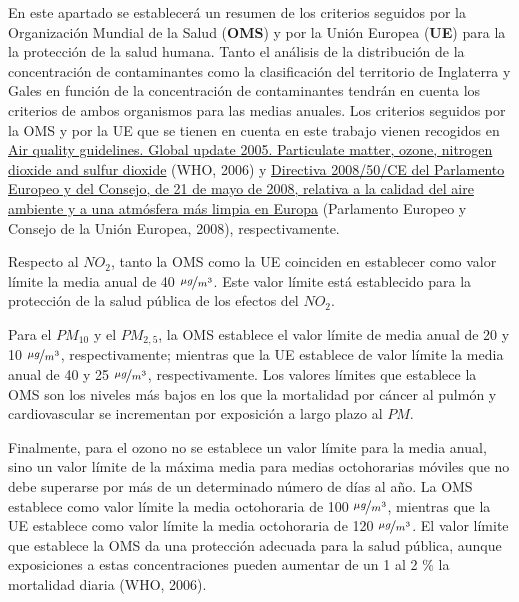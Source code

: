 \documentclass[12pt]{article}
\begin{document}
En este apartado se establecerá un resumen de los criterios seguidos por la Organización Mundial de la Salud (\textbf{OMS}) y por la Unión Europea (\textbf{UE}) para la la protección de la salud humana. Tanto el análisis de la distribución de la concentración de contaminantes como la clasificación del territorio de Inglaterra y Gales en función de la concentración de contaminantes tendrán en cuenta los criterios de ambos organismos para las medias anuales. Los criterios seguidos por la OMS y por la UE que se tienen en cuenta en este trabajo vienen recogidos en \href{http://www.euro.who.int/en/health-topics/environment-and-health/Housing-and-health/publications/pre-2009/air-quality-guidelines.-global-update-2005.-particulate-matter,-ozone,-nitrogen-dioxide-and-sulfur-dioxide}{Air quality guidelines. Global update 2005. Particulate matter, ozone, nitrogen dioxide and sulfur dioxide} (WHO, 2006) y \href{https://www.boe.es/buscar/doc.php?id=DOUE-L-2008-81053}{Directiva 2008/50/CE del Parlamento Europeo y del Consejo, de 21 de mayo de 2008, relativa a la calidad del aire ambiente y a una atmósfera más limpia en Europa} (Parlamento Europeo y Consejo de la Unión Europea, 2008), respectivamente.

Respecto al $NO_{2}$, tanto la OMS como la UE coinciden en establecer como valor límite la media anual de 40 $\nicefrac{\mu g}{m^{3}}$. Este valor límite está establecido para la protección de la salud pública de los efectos del $NO_{2}$.

Para el $PM_{10}$ y el $PM_{2,5}$, la OMS establece el valor límite de media anual de 20 y 10 $\nicefrac{\mu g}{m^{3}}$, respectivamente; mientras que la UE establece de valor límite la media anual de 40 y 25 $\nicefrac{\mu g}{m^{3}}$, respectivamente. Los valores límites que establece la OMS son los niveles más bajos en los que la mortalidad por cáncer al pulmón y cardiovascular se incrementan por exposición a largo plazo al $PM$.

Finalmente, para el ozono no se establece un valor límite para la media anual, sino un valor límite de la máxima media para medias octohorarias móviles que no debe superarse por más de un determinado número de días al año. La OMS establece como valor límite la media octohoraria de 100 $\nicefrac{\mu g}{m^{3}}$, mientras que la UE establece como valor límite la media octohoraria de 120 $\nicefrac{\mu g}{m^{3}}$. El valor límite que establece la OMS da una protección adecuada para la salud pública, aunque exposiciones a estas concentraciones pueden aumentar de un 1 al 2 $\%$ la mortalidad diaria (WHO, 2006).
\end{document}
